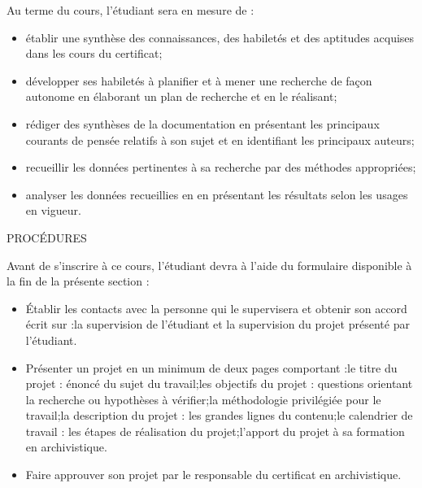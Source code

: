 \documentclass [12 pt]{article}
\begin{document}
            Au terme du cours, l'étudiant sera en mesure de :
            
        \begin{itemize}
        
                
        \item établir une synthèse des connaissances, des habiletés et des aptitudes acquises
                    dans les cours du certificat;
                
        \item développer ses habiletés à planifier et à mener une recherche de façon autonome
                    en élaborant un plan de recherche et en le réalisant;
                
        \item rédiger des synthèses de la documentation en présentant les principaux courants
                    de pensée relatifs à son sujet et en identifiant les principaux auteurs;
                
        \item recueillir les données pertinentes à sa recherche par des méthodes
                    appropriées;
                
        \item analyser les données recueillies en en présentant les résultats selon les usages
                    en vigueur.
            
        \end{itemize}
    
            
                PROCÉDURES
            
            Avant de s'inscrire à ce cours, l'étudiant devra à l'aide du formulaire disponible à
                la fin de la présente section :
            
        \begin{itemize}
        
                
        \item Établir les contacts avec la personne qui le supervisera et obtenir son accord
                    écrit sur :la supervision de l'étudiant et la supervision du projet
                            présenté par l'étudiant.
                
        \item Présenter un projet en un minimum de deux pages comportant :le titre du
                            projet : énoncé du sujet du travail;les objectifs du projet :
                            questions orientant la recherche ou hypothèses à vérifier;la
                            méthodologie privilégiée pour le travail;la description du
                            projet : les grandes lignes du contenu;le calendrier de travail
                            : les étapes de réalisation du projet;l'apport du projet à sa
                            formation en archivistique.
                
        \item Faire approuver son projet par le responsable du certificat en
                    archivistique.
            
        \end{itemize}
    
\end{document}

